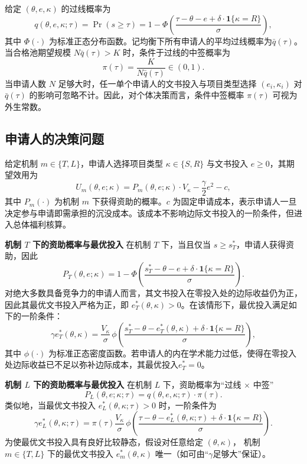 给定 $(\theta,e,\kappa)$ 的过线概率为
$$
    q(\theta,e,\kappa;\tau)=\Pr(s\ge\tau)
    =1-\Phi\!\left(\frac{\tau-\theta-e+\delta\cdot\mathbf{1}\{\kappa=R\}}{\sigma}\right),
$$
其中 $\Phi(\cdot)$ 为标准正态分布函数。记均衡下所有申请人的平均过线概率为$\bar q(\tau)$。当合格池期望规模 $N\bar q(\tau) > K$ 时，条件于过线的中签概率为
$$
    \pi(\tau)=\frac{K}{N\bar q(\tau)}\in(0,1).
$$
当申请人数 $N$ 足够大时，任一单个申请人的文书投入与项目类型选择 $(e_i,\kappa_i)$ 对 $\bar q(\tau)$ 的影响可忽略不计。因此，对个体决策而言，条件中签概率 $\pi(\tau)$ 可视为外生常数。

\subsection{\textbf{申请人的决策问题}}

给定机制 $m\in\{T,L\}$，申请人选择项目类型 $\kappa\in\{S,R\}$ 与文书投入 $e\ge 0$，其期望效用为
$$
    U_m(\theta,e;\kappa)=P_m(\theta,e;\kappa)\cdot V_\kappa-\frac{\gamma}{2}e^2-c,
$$
其中 $P_m(\cdot)$ 为机制 $m$ 下获得资助的概率。$c$ 为固定申请成本，表示申请人一旦决定参与申请即需承担的沉没成本。该成本不影响边际文书投入的一阶条件，但进入总体福利核算。

\textbf{机制 $T$ 下的资助概率与最优投入}\quad
在机制 $T$ 下，当且仅当 $s\ge s_T^*$，申请人获得资助，因此
$$
    P_T(\theta,e;\kappa)=1-\Phi\!\left(\frac{s_T^*-\theta-e+\delta\cdot\mathbf{1}\{\kappa=R\}}{\sigma}\right).
$$
对绝大多数具备竞争力的申请人而言，其文书投入在零投入处的边际收益仍为正，因此其最优文书投入严格为正，即 $e_T^*(\theta,\kappa)>0$。在该情形下，最优投入满足如下的一阶条件：
$$
    \gamma e_T^*(\theta,\kappa)=\frac{V_\kappa}{\sigma}\,
    \phi\!\left(\frac{s_T^*-\theta-e_T^*(\theta,\kappa)+\delta\cdot\mathbf{1}\{\kappa=R\}}{\sigma}\right),
$$
其中 $\phi(\cdot)$ 为标准正态密度函数。若申请人的内在学术能力过低，使得在零投入处边际收益已不足以弥补边际成本，其最优投入$e_T^*=0$。

\textbf{机制 $L$ 下的资助概率与最优投入}\quad
在机制 $L$ 下，资助概率为“过线 $\times$ 中签”
$$
    P_L(\theta,e;\kappa;\tau)=q(\theta,e,\kappa;\tau)\cdot \pi(\tau).
$$
类似地，当最优文书投入 $e_L^*(\theta,\kappa;\tau)>0$ 时，一阶条件为
$$
    \gamma e_L^*(\theta,\kappa;\tau)=\pi(\tau)\frac{V_\kappa}{\sigma}\,
    \phi\!\left(\frac{\tau-\theta-e_L^*(\theta,\kappa;\tau)+\delta\cdot\mathbf{1}\{\kappa=R\}}{\sigma}\right).
$$
为使最优文书投入具有良好比较静态，假设对任意给定 $(\theta,\kappa)$，
机制 $m\in\{T,L\}$ 下的最优文书投入 $e_m^*(\theta,\kappa)$ 唯一（如可由“$\gamma$足够大”保证）。


